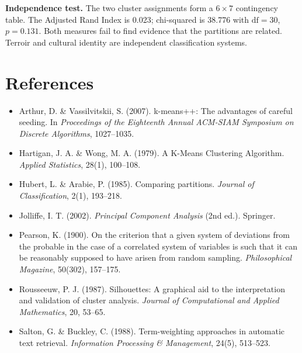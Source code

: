 \documentclass[11pt]{article}
\begin{document}
\textbf{Independence test.} The two cluster assignments form a $6 \times 7$ contingency table. The Adjusted Rand Index is 0.023; chi-squared is 38.776 with $\mathrm{df} = 30$, $p = 0.131$. Both measures fail to find evidence that the partitions are related. Terroir and cultural identity are independent classification systems.

\section*{References}

\begin{itemize}[leftmargin=2em,itemsep=0.2em]
\item Arthur, D. \& Vassilvitskii, S. (2007). k-means++: The advantages of careful seeding. In \emph{Proceedings of the Eighteenth Annual ACM-SIAM Symposium on Discrete Algorithms}, 1027--1035.
\item Hartigan, J. A. \& Wong, M. A. (1979). A K-Means Clustering Algorithm. \emph{Applied Statistics}, 28(1), 100--108.
\item Hubert, L. \& Arabie, P. (1985). Comparing partitions. \emph{Journal of Classification}, 2(1), 193--218.
\item Jolliffe, I. T. (2002). \emph{Principal Component Analysis} (2nd ed.). Springer.
\item Pearson, K. (1900). On the criterion that a given system of deviations from the probable in the case of a correlated system of variables is such that it can be reasonably supposed to have arisen from random sampling. \emph{Philosophical Magazine}, 50(302), 157--175.
\item Rousseeuw, P. J. (1987). Silhouettes: A graphical aid to the interpretation and validation of cluster analysis. \emph{Journal of Computational and Applied Mathematics}, 20, 53--65.
\item Salton, G. \& Buckley, C. (1988). Term-weighting approaches in automatic text retrieval. \emph{Information Processing \& Management}, 24(5), 513--523.
\end{itemize}
\end{document}
